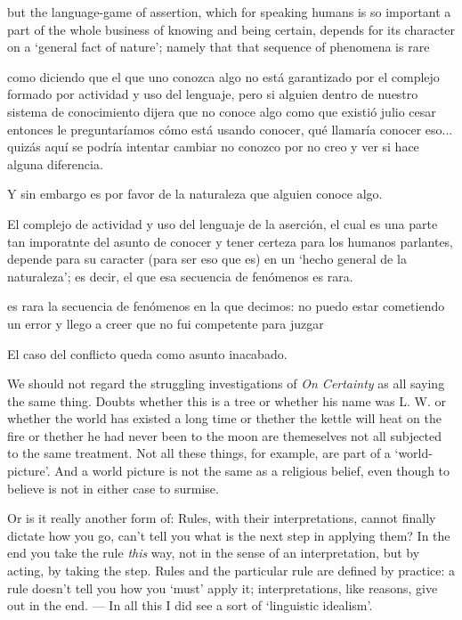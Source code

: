   but the language-game of assertion, which for speaking humans is so important a part of the whole business of knowing and being certain, depends for its character on a `general fact of nature'; namely that that sequence of phenomena is rare

  como diciendo que el que uno conozca algo no está garantizado por el complejo formado por actividad y uso del lenguaje, pero si alguien dentro de nuestro sistema de conocimiento dijera que no conoce algo como que existió julio cesar entonces le preguntaríamos cómo está usando conocer, qué llamaría conocer eso... quizás aquí se podría intentar cambiar no conozco por no creo y ver si hace alguna diferencia.

  Y sin embargo es por favor de la naturaleza que alguien conoce algo.

  El complejo de actividad y uso del lenguaje de la aserción, el cual es una parte tan imporatnte del asunto de conocer y tener certeza para los humanos parlantes, depende para su caracter (para ser eso que es) en un `hecho general de la naturaleza'; es decir, el que esa secuencia de fenómenos es rara.

  es rara la secuencia de fenómenos en la que decimos: no puedo estar cometiendo un error y llego a creer que no fui competente para juzgar


  El caso del conflicto queda como asunto inacabado.











  We should not regard the struggling investigations of \emph{On Certainty} as all saying the same thing. Doubts whether this is a tree or whether his name was L. W. or whether the world has existed a long time or thether the kettle will heat on the fire or thether he had never been to the moon are themeselves not all subjected to the same treatment. Not all these things, for example, are part of a `world-picture'. And a world picture is not the same as a religious belief, even though to believe is not in either case to surmise.

Or is it really another form of:
Rules, with their interpretations, cannot finally dictate how you go, can't tell you what is the next step in applying them? In the end you take the rule \emph{this} way, not in the sense of an interpretation, but by acting, by taking the step. Rules and the particular rule are defined by practice: a rule doesn't tell you how you `must' apply it; interpretations, like reasons, give out in the end. --- In all this I did see a sort of `linguistic idealism'.

